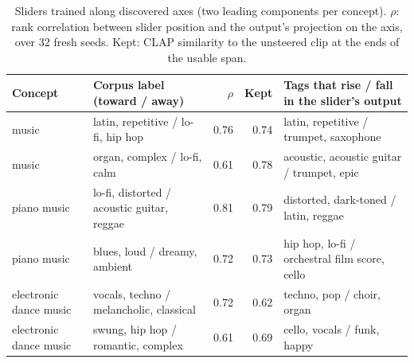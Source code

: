 \begin{table}[t]\centering\small
\begin{tabular}{llrrl}
\toprule
Concept & Corpus label (toward / away) & $\rho$ & Kept & Tags that rise / fall in the slider's output \\
\midrule
music & latin, repetitive / lo-fi, hip hop & 0.76 & 0.74 & latin, repetitive / trumpet, saxophone \\
music & organ, complex / lo-fi, calm & 0.61 & 0.78 & acoustic, acoustic guitar / trumpet, epic \\
piano music & lo-fi, distorted / acoustic guitar, reggae & 0.81 & 0.79 & distorted, dark-toned / latin, reggae \\
piano music & blues, loud / dreamy, ambient & 0.72 & 0.73 & hip hop, lo-fi / orchestral film score, cello \\
electronic dance music & vocals, techno / melancholic, classical & 0.72 & 0.62 & techno, pop / choir, organ \\
electronic dance music & swung, hip hop / romantic, complex & 0.61 & 0.69 & cello, vocals / funk, happy \\
\bottomrule
\end{tabular}
\caption{Sliders trained along discovered axes (two leading components per concept). $\rho$: rank correlation between slider position and the output's projection on the axis, over 32 fresh seeds. Kept: CLAP similarity to the unsteered clip at the ends of the usable span.}\label{tab:found}
\end{table}
